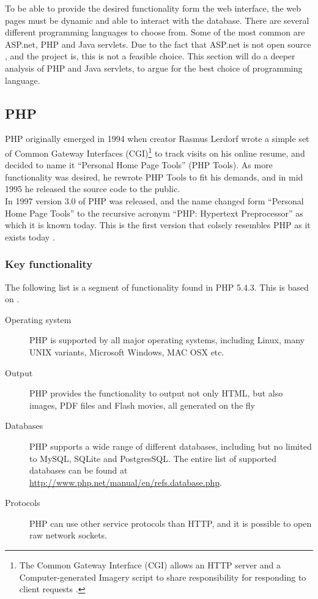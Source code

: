 To be able to provide the desired functionality form the web interface, the web pages must be dynamic and able to interact with the database. There are several different programming languages to choose from. Some of the most common are ASP.net, PHP and Java servlets. Due to the fact that ASP.net is not open source \cite{aspTerms}, and the project is, this is not a feasible choice. This section will do a deeper analysis of PHP and Java servlets, to argue for the best choice of programming language.

\subsection*{PHP}
PHP originally emerged in 1994 when creator Rasmus Lerdorf wrote a simple set of Common Gateway Interfaces (CGI)\footnote{The Common Gateway Interface (CGI) allows an HTTP server and a Computer-generated Imagery script to share responsibility for responding to client requests \cite{CGI}.} to track visits on his online resume, and decided to name it ``Personal Home Page Tools'' (PHP Tools). As more functionality was desired, he rewrote PHP Tools to fit his demands, and in mid 1995 he released the source code to the public.
\\In 1997 version 3.0 of PHP was released, and the name changed form ``Personal Home Page Tools'' to the recursive acronym ``PHP: Hypertext Preprocessor'' as which it is known today. This is the first version that colsely resembles PHP as it exists today \cite{phpHistory}.


\subsubsection*{Key functionality}

\noindent The following list is a segment of functionality found in PHP 5.4.3. This is based on \cite{phpFunctionality}.

\begin{description}
	\item[Operating system] PHP is supported by all major operating systems, including Linux, many UNIX variants, Microsoft Windows, MAC OSX etc.
	\item[Output] PHP provides the functionality to output not only HTML, but also images, PDF files and Flash movies, all generated on the fly
	\item[Databases] PHP supports a wide range of different databases, including but no limited to MySQL, SQLite and PostgresSQL. The entire list of supported databases can be found at \url{http://www.php.net/manual/en/refs.database.php}. 
	\item[Protocols] PHP can use other service protocols than HTTP, and it is possible to open raw network sockets.
\end{description}


